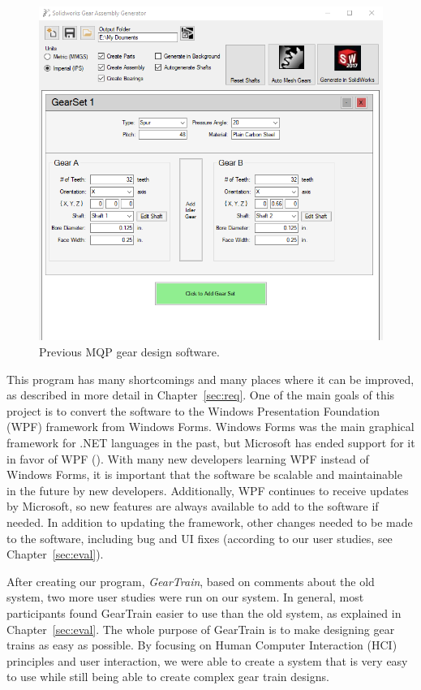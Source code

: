 \begin{doublespace}
\begin{figure}[htbp]
    \centering
    \includegraphics[width=\textwidth]{images/old_gear_system.png}
    \caption{Previous MQP gear design software.}
    \label{fig:old_gear_system}
\end{figure}

This program has many shortcomings and many places where it can be improved, as described in more detail in Chapter~\ref{sec:req}. One of the main goals of this project is to convert the software to the Windows Presentation Foundation (WPF) framework from Windows Forms. Windows Forms was the main graphical framework for .NET languages in the past, but Microsoft has ended support for it in favor of WPF (\cite{allen_wpf_2014}). With many new developers learning WPF instead of Windows Forms, it is important that the software be scalable and maintainable in the future by new developers. Additionally, WPF continues to receive updates by Microsoft, so new features are always available to add to the software if needed. In addition to updating the framework, other changes needed to be made to the software, including bug and UI fixes (according to our user studies, see Chapter~\ref{sec:eval}).

After creating our program, \emph{GearTrain}, based on comments about the old system, two more user studies were run on our system. In general, most participants found GearTrain easier to use than the old system, as explained in Chapter~\ref{sec:eval}. The whole purpose of GearTrain is to make designing gear trains as easy as possible. By focusing on Human Computer Interaction (HCI) principles and user interaction, we were able to create a system that is very easy to use while still being able to create complex gear train designs.


\end{doublespace}
